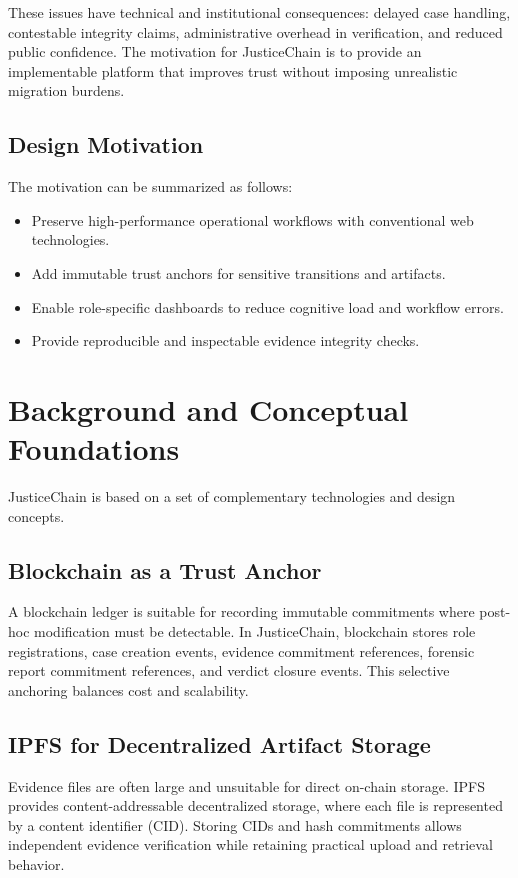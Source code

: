 \documentclass[conference]{IEEEtran}
\begin{document}
These issues have technical and institutional consequences: delayed case handling, contestable integrity claims, administrative overhead in verification, and reduced public confidence. The motivation for JusticeChain is to provide an implementable platform that improves trust without imposing unrealistic migration burdens.

\subsection{Design Motivation}
The motivation can be summarized as follows:
\begin{itemize}
    \item Preserve high-performance operational workflows with conventional web technologies.
    \item Add immutable trust anchors for sensitive transitions and artifacts.
    \item Enable role-specific dashboards to reduce cognitive load and workflow errors.
    \item Provide reproducible and inspectable evidence integrity checks.
\end{itemize}

\section{Background and Conceptual Foundations}
JusticeChain is based on a set of complementary technologies and design concepts.

\subsection{Blockchain as a Trust Anchor}
A blockchain ledger is suitable for recording immutable commitments where post-hoc modification must be detectable. In JusticeChain, blockchain stores role registrations, case creation events, evidence commitment references, forensic report commitment references, and verdict closure events. This selective anchoring balances cost and scalability.

\subsection{IPFS for Decentralized Artifact Storage}
Evidence files are often large and unsuitable for direct on-chain storage. IPFS provides content-addressable decentralized storage, where each file is represented by a content identifier (CID). Storing CIDs and hash commitments allows independent evidence verification while retaining practical upload and retrieval behavior.
\end{document}
